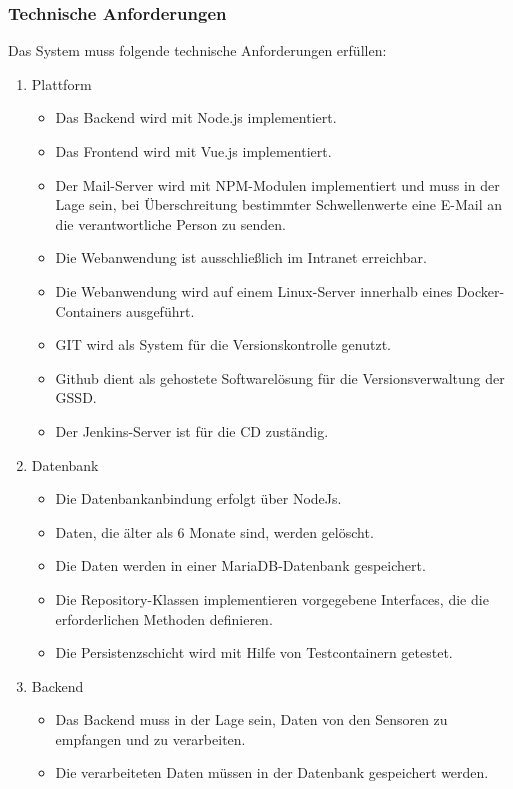 \subsubsection{Technische Anforderungen}

Das System muss folgende technische Anforderungen erfüllen:

\begin{enumerate}
	\item Plattform
			\begin{itemize}
			\item Das Backend wird mit Node.js implementiert.
			\item Das Frontend wird mit Vue.js implementiert.
			\item Der Mail-Server wird mit \acs{NPM}-Modulen implementiert und muss in der Lage sein, bei Überschreitung bestimmter Schwellenwerte eine E-Mail an die verantwortliche Person zu senden.
			\item Die Webanwendung ist ausschließlich im Intranet erreichbar.
			\item Die Webanwendung wird auf einem Linux-Server innerhalb eines Docker-Containers ausgeführt.
			\item \acs{GIT} wird als System für die Versionskontrolle genutzt.
			\item Github dient als gehostete Softwarelösung für die Versionsverwaltung der \acs{GSSD}.
			\item Der Jenkins-Server ist für die \acs{CD} zuständig.
			\end{itemize}
		\item Datenbank
			\begin{itemize}
				\item Die Datenbankanbindung erfolgt über NodeJs.
				\item Daten, die älter als 6 Monate sind, werden gelöscht.
				\item Die Daten werden in einer MariaDB-Datenbank gespeichert.
				\item Die Repository-Klassen implementieren vorgegebene Interfaces, die die erforderlichen Methoden definieren.
				\item Die Persistenzschicht wird mit Hilfe von Testcontainern getestet.
			\end{itemize}
		\item Backend
			\begin{itemize}
				\item Das Backend muss in der Lage sein, Daten von den Sensoren zu empfangen und zu verarbeiten.
				\item Die verarbeiteten Daten müssen in der Datenbank gespeichert werden.

\end{itemize}
\end{enumerate}
